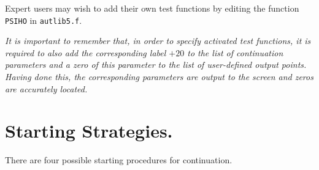 \documentclass[12pt]{report}
\begin{document}
Expert users may wish to add their own test functions by editing 
the function {\tt PSIHO} in {\tt autlib5.f}.

{\it It is important to remember that, in order to specify activated 
test functions, it is required to also 
add the corresponding label $+20$ to the list of continuation
parameters and a zero of this parameter to the list of user-defined
output points. Having done this, the corresponding parameters
are output to the screen and zeros are accurately located.} 

\section{ Starting Strategies.} \label{sec:Starting_strategies}
There are four possible starting procedures for continuation. 
\end{document}
